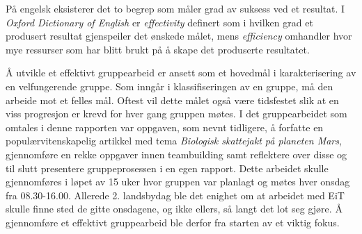 







På engelsk eksisterer det to begrep som måler grad av suksess ved et resultat. 
I \textit{Oxford Dictionary of English} er \textit{effectivity} definert som i hvilken grad et produsert resultat gjenspeiler det ønskede målet, mens \textit{efficiency} omhandler hvor mye ressurser som har blitt brukt på å skape det produserte resultatet. 

Å utvikle et effektivt gruppearbeid er ansett som et hovedmål i karakterisering av en velfungerende gruppe. 
Som inngår i klassifiseringen av en gruppe, må den arbeide mot et felles mål. 
Oftest vil dette målet også være tidsfestet slik at en viss progresjon er krevd for hver gang gruppen møtes. 
I det gruppearbeidet som omtales i denne rapporten var oppgaven, som nevnt tidligere, å forfatte en populærvitenskapelig artikkel med tema \textit{Biologisk skattejakt på planeten Mars}, gjennomføre en rekke oppgaver innen teambuilding samt reflektere over disse og til slutt presentere gruppeprosessen i en egen rapport. 
Dette arbeidet skulle gjennomføres i løpet av 15 uker hvor gruppen var planlagt og møtes hver onsdag fra 08.30-16.00. 
Allerede 2. landsbydag ble det enighet om at arbeidet med EiT skulle finne sted de gitte onsdagene, og ikke ellers, så langt det lot seg gjøre. 
Å gjennomføre et effektivt gruppearbeid ble derfor fra starten av et viktig fokus. 

